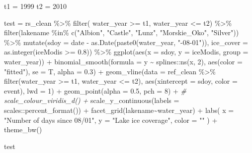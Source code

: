 \documentclass[
]{article}
\newenvironment{Shaded}{\begin{snugshade}}{\end{snugshade}}
\newcommand{\AttributeTok}[1]{\textcolor[rgb]{0.77,0.63,0.00}{#1}}
\newcommand{\CommentTok}[1]{\textcolor[rgb]{0.56,0.35,0.01}{\textit{#1}}}
\newcommand{\DecValTok}[1]{\textcolor[rgb]{0.00,0.00,0.81}{#1}}
\newcommand{\FloatTok}[1]{\textcolor[rgb]{0.00,0.00,0.81}{#1}}
\newcommand{\FunctionTok}[1]{\textcolor[rgb]{0.00,0.00,0.00}{#1}}
\newcommand{\NormalTok}[1]{#1}
\newcommand{\OtherTok}[1]{\textcolor[rgb]{0.56,0.35,0.01}{#1}}
\newcommand{\SpecialCharTok}[1]{\textcolor[rgb]{0.00,0.00,0.00}{#1}}
\newcommand{\StringTok}[1]{\textcolor[rgb]{0.31,0.60,0.02}{#1}}
\begin{document}
\begin{Shaded}
\begin{Highlighting}[]
\NormalTok{t1 }\OtherTok{=} \DecValTok{1999}
\NormalTok{t2 }\OtherTok{=} \DecValTok{2010}

\NormalTok{test }\OtherTok{=}\NormalTok{ rs\_clean }\SpecialCharTok{\%\textgreater{}\%} 
  \FunctionTok{filter}\NormalTok{(}
\NormalTok{    water\_year }\SpecialCharTok{\textgreater{}=}\NormalTok{ t1,}
\NormalTok{    water\_year }\SpecialCharTok{\textless{}=}\NormalTok{ t2) }\SpecialCharTok{\%\textgreater{}\%} 
  \FunctionTok{filter}\NormalTok{(lakename }\SpecialCharTok{\%in\%} \FunctionTok{c}\NormalTok{(}\StringTok{"Albion"}\NormalTok{, }\StringTok{"Castle"}\NormalTok{, }\StringTok{"Lunz"}\NormalTok{, }\StringTok{"Morskie\_Oko"}\NormalTok{, }\StringTok{"Silver"}\NormalTok{)) }\SpecialCharTok{\%\textgreater{}\%} 
  \FunctionTok{mutate}\NormalTok{(}\AttributeTok{sdoy =}\NormalTok{ date }\SpecialCharTok{{-}} \FunctionTok{as.Date}\NormalTok{(}\FunctionTok{paste0}\NormalTok{(water\_year, }\StringTok{"{-}08{-}01"}\NormalTok{)),}
         \AttributeTok{ice\_cover =} \FunctionTok{as.integer}\NormalTok{(iceModis }\SpecialCharTok{\textgreater{}=} \FloatTok{0.8}\NormalTok{)) }\SpecialCharTok{\%\textgreater{}\%} 
  \FunctionTok{ggplot}\NormalTok{(}\FunctionTok{aes}\NormalTok{(}\AttributeTok{x =}\NormalTok{ sdoy, }\AttributeTok{y =}\NormalTok{ iceModis, }\AttributeTok{group =}\NormalTok{ water\_year)) }\SpecialCharTok{+}
  \FunctionTok{binomial\_smooth}\NormalTok{(}\AttributeTok{formula =}\NormalTok{ y }\SpecialCharTok{\textasciitilde{}}\NormalTok{ splines}\SpecialCharTok{::}\FunctionTok{ns}\NormalTok{(x, }\DecValTok{2}\NormalTok{), }\FunctionTok{aes}\NormalTok{(}\AttributeTok{color =} \StringTok{"fitted"}\NormalTok{), }\AttributeTok{se =}\NormalTok{ T, }\AttributeTok{alpha =} \FloatTok{0.3}\NormalTok{) }\SpecialCharTok{+}
  \FunctionTok{geom\_vline}\NormalTok{(}\AttributeTok{data =}\NormalTok{ ref\_clean }\SpecialCharTok{\%\textgreater{}\%} \FunctionTok{filter}\NormalTok{(water\_year }\SpecialCharTok{\textgreater{}=}\NormalTok{ t1, water\_year }\SpecialCharTok{\textless{}=}\NormalTok{ t2), }\FunctionTok{aes}\NormalTok{(}\AttributeTok{xintercept =}\NormalTok{ sdoy, }\AttributeTok{color =}\NormalTok{ event), }\AttributeTok{lwd =} \DecValTok{1}\NormalTok{) }\SpecialCharTok{+}
  \FunctionTok{geom\_point}\NormalTok{(}\AttributeTok{alpha =} \FloatTok{0.5}\NormalTok{, }\AttributeTok{pch =} \DecValTok{8}\NormalTok{) }\SpecialCharTok{+}
  \CommentTok{\# scale\_colour\_viridis\_d() +}
  \FunctionTok{scale\_y\_continuous}\NormalTok{(}\AttributeTok{labels =}\NormalTok{ scales}\SpecialCharTok{::}\FunctionTok{percent\_format}\NormalTok{()) }\SpecialCharTok{+}
  \FunctionTok{facet\_grid}\NormalTok{(lakename}\SpecialCharTok{\textasciitilde{}}\NormalTok{water\_year) }\SpecialCharTok{+}
  \FunctionTok{labs}\NormalTok{(}
    \AttributeTok{x =} \StringTok{"Number of days since 08/01"}\NormalTok{,}
    \AttributeTok{y =} \StringTok{"Lake ice coverage"}\NormalTok{,}
    \AttributeTok{color =} \StringTok{""}
\NormalTok{  ) }\SpecialCharTok{+} 
  \FunctionTok{theme\_bw}\NormalTok{()}

\NormalTok{test}
\end{Highlighting}
\end{Shaded}
\end{document}
